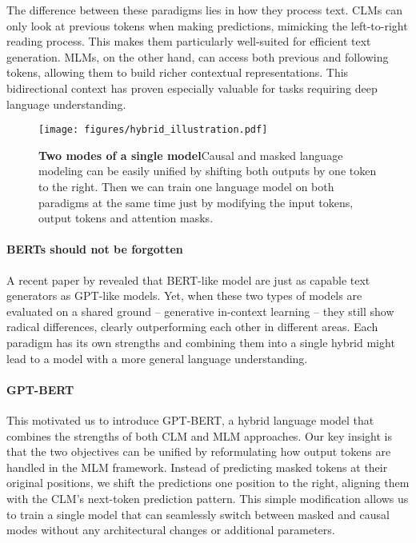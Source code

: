 The difference between these paradigms lies in how they process text. CLMs can only look at previous tokens when making predictions, mimicking the left-to-right reading process. This makes them particularly well-suited for efficient text generation. MLMs, on the other hand, can access both previous and following tokens, allowing them to build richer contextual representations. This bidirectional context has proven especially valuable for tasks requiring deep language understanding.

\begin{figure}[!t]
        \centering
        \texttt{[image: figures/hybrid\_illustration.pdf]}
        \caption{\textbf{Two modes of a single model}\hspace{1.5em}Causal and masked language modeling can be easily unified by shifting both outputs by one token to the right. Then we can train one language model on both paradigms at the same time just by modifying the input tokens, output tokens and attention masks.}
        \label{fig:hybrid}
    \end{figure}

\paragraph{BERTs should not be forgotten}
A recent paper by  revealed that BERT-like model are just as capable text generators as GPT-like models. Yet, when these two types of models are evaluated on a shared ground -- generative in-context learning \citep{NEURIPS2020_1457c0d6} -- they still show radical differences, clearly outperforming each other in different areas. Each paradigm has its own strengths and combining them into a single hybrid might lead to a model with a more general language understanding.

\paragraph{GPT-BERT}
This motivated us to introduce \textsc{GPT-BERT}, a hybrid language model that combines the strengths of both CLM and MLM approaches. Our key insight is that the two objectives can be unified by reformulating how output tokens are handled in the MLM framework. Instead of predicting masked tokens at their original positions, we shift the predictions one position to the right, aligning them with the CLM's next-token prediction pattern. This simple modification allows us to train a single model that can seamlessly switch between masked and causal modes without any architectural changes or additional parameters.

